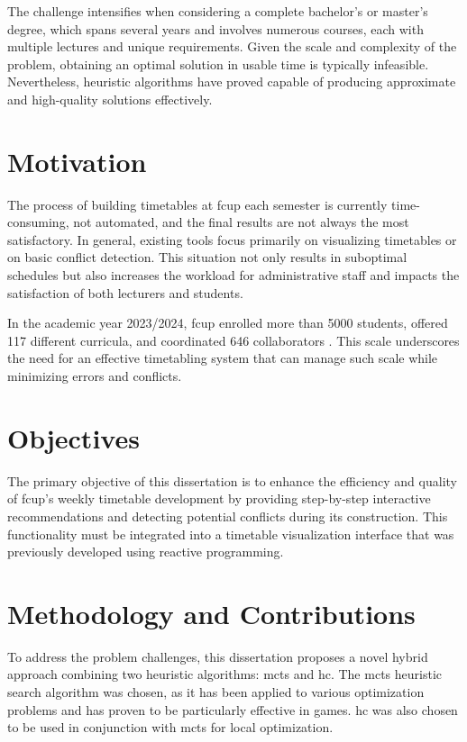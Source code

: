 The challenge intensifies when considering a complete bachelor’s or master’s degree, which spans several years and involves numerous courses, each with multiple lectures and unique requirements. Given the scale and complexity of the problem, obtaining an optimal solution in usable time is typically infeasible. Nevertheless, heuristic algorithms have proved capable of producing approximate and high-quality solutions effectively. 

\section{Motivation}

The process of building timetables at \ac{fcup} each semester is currently time-consuming, not automated, and the final results are not always the most satisfactory. In general, existing tools focus primarily on visualizing timetables or on basic conflict detection. This situation not only results in suboptimal schedules but also increases the workload for administrative staff and impacts the satisfaction of both lecturers and students. 

In the academic year 2023/2024, \ac{fcup} enrolled more than 5000 students, offered 117 different curricula, and coordinated 646 collaborators \cite{fcup_em_numeros}. This scale underscores the need for an effective timetabling system that can manage such scale while minimizing errors and conflicts. %

\section{Objectives}

The primary objective of this dissertation is to enhance the efficiency and quality of \ac{fcup}'s weekly timetable development by providing step-by-step interactive recommendations and detecting potential conflicts during its construction. This functionality must be integrated into a timetable visualization interface that was previously developed using reactive programming.

\section{Methodology and Contributions}

To address the problem challenges, this dissertation proposes a novel hybrid approach combining two heuristic algorithms: \ac{mcts} and \ac{hc}. The \ac{mcts} heuristic search algorithm was chosen, as it has been applied to various optimization problems and has proven to be particularly effective in games. \ac{hc} was also chosen to be used in conjunction with \ac{mcts} for local optimization. 

